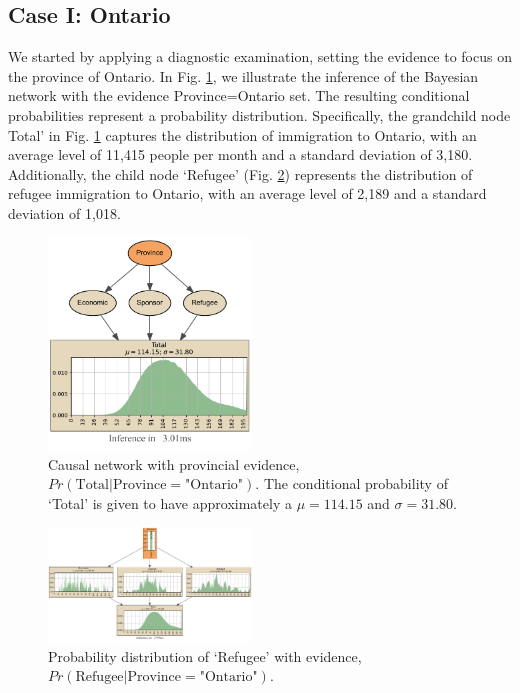 \documentclass[conference]{IEEEtran}
\begin{document}
	\subsection{Case I: Ontario}
	We started by applying a diagnostic examination, setting the evidence to focus on the province of Ontario. In Fig. \ref{fig:inferenceOntario}, we illustrate the inference of the Bayesian network with the evidence Province=Ontario set. The resulting conditional probabilities represent a probability distribution. Specifically, the grandchild node Total' in Fig. \ref{fig:inferenceOntario} captures the distribution of immigration to Ontario, with an average level of 11,415 people per month and a standard deviation of 3,180. Additionally, the child node `Refugee' (Fig. \ref{fig:parts_province_inference}) represents the distribution of refugee immigration to Ontario, with an average level of 2,189 and a standard deviation of 1,018.
	
	\begin{figure}[!htb]
		\begin{center}
			\includegraphics[clip, trim= 0 25 0 0, width=0.48\textwidth]{fig/inference_ontario.pdf}
			\caption{Causal network with provincial evidence, $Pr(\text{Total}|\text{Province}=\text{"Ontario"})$.  The conditional probability of `Total' is given to have approximately a $\mu=114.15$ and $\sigma=31.80$.
			}\label{fig:inferenceOntario}
		\end{center}
	\end{figure}
	
	\begin{figure}[!htb]
		\begin{center}
			\includegraphics[clip, trim= 391 129 5 116, width=0.48\textwidth]{fig/inference_ontario_parts.pdf}
			\caption{Probability distribution of `Refugee' with evidence, $Pr(\text{Refugee}|\text{Province}=\text{"Ontario"})$.
			}\label{fig:parts_province_inference}
		\end{center}
	\end{figure}
	
\end{document}
